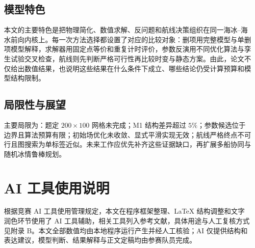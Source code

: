 \documentclass[UTF8]{ctexart}
\begin{document}
\subsection{模型特色}

本文的主要特色是把物理简化、数值求解、反问题和航线决策组织在同一海冰--海水前向内核上。每一次方法选择都设置了对应的比较对象：删项用完整模型与单删项模型解释，求解器用固定点等价和重复计时评价，参数反演用不同优化算法与孪生试验交叉检查，航线则先判断严格可行性再比较时变与静态方案。由此，论文不仅给出数值结果，也说明这些结果在什么条件下成立、哪些结论仍受计算预算和模型结构限制。

\subsection{局限性与展望}

主要局限为：题定 $200\times100$ 网格未完成；M1 结构差异超过 $5\%$；参数候选位于边界且算法预算有限；初始场优化未收敛、显式平滑实现无效；航线严格终点不可行且图搜索为单标签近似。未来工作应优先补齐这些证据缺口，再扩展多船协同与随机冰情鲁棒规划。

\section*{AI 工具使用说明}

根据竞赛 AI 工具使用管理规定，本文在程序框架整理、LaTeX 结构调整和文字润色环节使用了 AI 工具辅助，相关工具列入参考文献\cite{openai_codex}，具体用途与人工复核方式见附录 B。本文全部数值均由本地程序运行产生并经人工核验；AI 仅提供结构和表达建议，模型判断、结果解释与正文定稿均由参赛队员完成。
\end{document}
